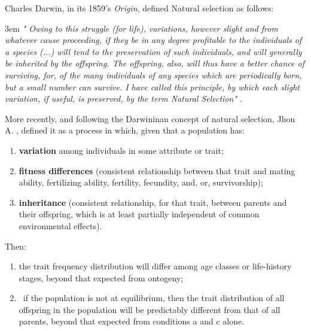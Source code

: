 Charles Darwin, in its 1859's \textit{Origin}, defined Natural selection as follows:
\begin{flushleft}
\leftskip3em
\rightskip\leftskip
\footnotesize{
\textit{
" Owing to this struggle (for life), variations, however slight and from whatever cause proceeding, if they be in any degree profitable to the individuals of a species (...) will tend to the preservation of such individuals, and will generally be inherited by the offspring. The offspring, also, will thus have a better chance of surviving, for, of the many individuals of any species which are periodically born, but a small number can survive. I have called this principle,
by which each slight variation, if useful, is preserved, by the term Natural Selection"} \citep{darwin1859origin}.
}
\end{flushleft}

More recently, and following the Darwininan concept of natural selection, Jhon A. \citet{endler1986natural}, defined it as a process in which, given that a population has:

\vspace{3mm}
\begin{enumerate}[label=\textit{\alph*.}]
\item \textbf{variation} among individuals in some attribute or trait;
\item \textbf{fitness differences} (consistent relationship between that trait and mating ability, fertilizing ability, fertility, fecundity, and, or, survivorship);
\item  \textbf{inheritance} (consistent relationship, for that trait, between parents and their offspring, which is at least partially independent of common environmental effects).
\end{enumerate}
\vspace{3mm}
Then:
\vspace{3mm}
\begin{enumerate}
\item the trait frequency distribution will differ among age classes or life-history stages, beyond that expected from ontogeny;
\item\ if the population is not at equilibrium, then the trait distribution of all offspring in the population will be predictably different from that of all parents, beyond that expected
from conditions a and c alone.
\end{enumerate}
\vspace{3mm}


